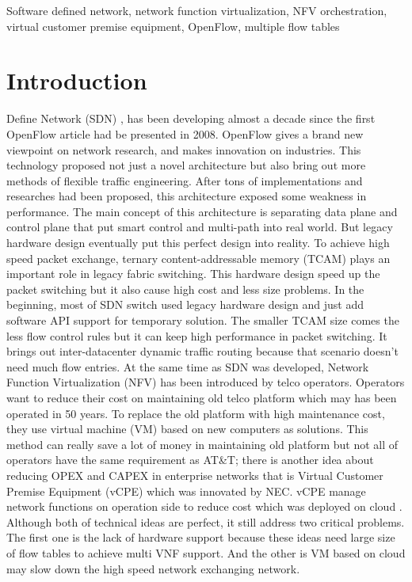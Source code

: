 \documentclass[10pt,journal]{IEEEtran}
\begin{document}
\begin{IEEEkeywords}
Software defined network, network function virtualization, NFV orchestration, virtual customer premise equipment, OpenFlow, multiple flow tables
\end{IEEEkeywords}

\IEEEpeerreviewmaketitle{}


\section{Introduction}
 Define Network (SDN) \cite{sdn-new-norm}, \cite{sdn-comprehensive} has been developing almost a decade since the first OpenFlow article had be presented in 2008\cite{openflow-campus-network}. OpenFlow\cite{sp:openflow13} gives a brand new viewpoint on network research, and makes innovation on industries. This technology proposed not just a novel architecture but also bring out more methods of flexible traffic engineering. After tons of implementations and researches had been proposed, this architecture exposed some weakness in performance. The main concept of this architecture is separating data plane and control plane that put smart control and multi-path into real world. But legacy hardware design eventually put this perfect design into reality. To achieve high speed packet exchange, ternary content-addressable memory (TCAM) plays an important role in legacy fabric switching. This hardware design speed up the packet switching but it also cause high cost and less size problems.
In the beginning, most of SDN switch used legacy hardware design and just add software API support for temporary solution. The smaller TCAM size comes the less flow control rules but it can keep high performance in packet switching. It brings out inter-datacenter dynamic traffic routing because that scenario doesn’t need much flow entries.
At the same time as SDN was developed, Network Function Virtualization (NFV) \cite{nfvwp,nfv-survey,laptop-sdn} has been introduced by telco operators. Operators want to reduce their cost on maintaining old telco platform which may has been operated in 50 years. To replace the old platform with high maintenance cost, they use virtual machine (VM) based on new computers as solutions. This method can really save a lot of money in maintaining old platform but not all of operators have the same requirement as AT\&T; there is another idea about reducing OPEX and CAPEX in enterprise networks that is Virtual Customer Premise Equipment (vCPE) which was innovated by NEC\cite{nec-vcpe}. vCPE manage network functions on operation side to reduce cost which was deployed on cloud \cite{cloud4nfv}. Although both of technical ideas are perfect, it still address two critical problems. The first one is the lack of hardware support because these ideas need large size of flow tables to achieve multi VNF support. And the other is VM based on cloud may slow down the high speed network exchanging network\cite{nfv-placemet, nfv-placement-model}.
\end{document}
